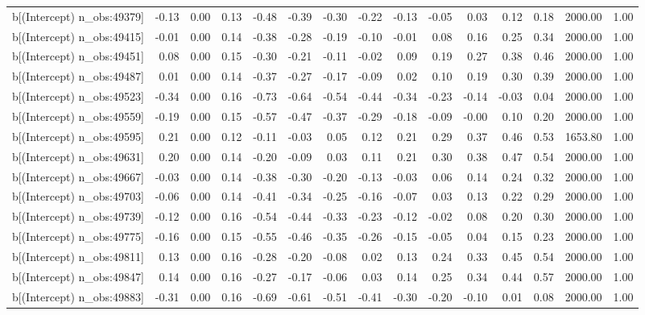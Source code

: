 \begin{table}[ht]
\begin{tabular}{rrrrrrrrrrrrrrr}
  b[(Intercept) n\_obs:49379] & -0.13 & 0.00 & 0.13 & -0.48 & -0.39 & -0.30 & -0.22 & -0.13 & -0.05 & 0.03 & 0.12 & 0.18 & 2000.00 & 1.00 \\ 
  b[(Intercept) n\_obs:49415] & -0.01 & 0.00 & 0.14 & -0.38 & -0.28 & -0.19 & -0.10 & -0.01 & 0.08 & 0.16 & 0.25 & 0.34 & 2000.00 & 1.00 \\ 
  b[(Intercept) n\_obs:49451] & 0.08 & 0.00 & 0.15 & -0.30 & -0.21 & -0.11 & -0.02 & 0.09 & 0.19 & 0.27 & 0.38 & 0.46 & 2000.00 & 1.00 \\ 
  b[(Intercept) n\_obs:49487] & 0.01 & 0.00 & 0.14 & -0.37 & -0.27 & -0.17 & -0.09 & 0.02 & 0.10 & 0.19 & 0.30 & 0.39 & 2000.00 & 1.00 \\ 
  b[(Intercept) n\_obs:49523] & -0.34 & 0.00 & 0.16 & -0.73 & -0.64 & -0.54 & -0.44 & -0.34 & -0.23 & -0.14 & -0.03 & 0.04 & 2000.00 & 1.00 \\ 
  b[(Intercept) n\_obs:49559] & -0.19 & 0.00 & 0.15 & -0.57 & -0.47 & -0.37 & -0.29 & -0.18 & -0.09 & -0.00 & 0.10 & 0.20 & 2000.00 & 1.00 \\ 
  b[(Intercept) n\_obs:49595] & 0.21 & 0.00 & 0.12 & -0.11 & -0.03 & 0.05 & 0.12 & 0.21 & 0.29 & 0.37 & 0.46 & 0.53 & 1653.80 & 1.00 \\ 
  b[(Intercept) n\_obs:49631] & 0.20 & 0.00 & 0.14 & -0.20 & -0.09 & 0.03 & 0.11 & 0.21 & 0.30 & 0.38 & 0.47 & 0.54 & 2000.00 & 1.00 \\ 
  b[(Intercept) n\_obs:49667] & -0.03 & 0.00 & 0.14 & -0.38 & -0.30 & -0.20 & -0.13 & -0.03 & 0.06 & 0.14 & 0.24 & 0.32 & 2000.00 & 1.00 \\ 
  b[(Intercept) n\_obs:49703] & -0.06 & 0.00 & 0.14 & -0.41 & -0.34 & -0.25 & -0.16 & -0.07 & 0.03 & 0.13 & 0.22 & 0.29 & 2000.00 & 1.00 \\ 
  b[(Intercept) n\_obs:49739] & -0.12 & 0.00 & 0.16 & -0.54 & -0.44 & -0.33 & -0.23 & -0.12 & -0.02 & 0.08 & 0.20 & 0.30 & 2000.00 & 1.00 \\ 
  b[(Intercept) n\_obs:49775] & -0.16 & 0.00 & 0.15 & -0.55 & -0.46 & -0.35 & -0.26 & -0.15 & -0.05 & 0.04 & 0.15 & 0.23 & 2000.00 & 1.00 \\ 
  b[(Intercept) n\_obs:49811] & 0.13 & 0.00 & 0.16 & -0.28 & -0.20 & -0.08 & 0.02 & 0.13 & 0.24 & 0.33 & 0.45 & 0.54 & 2000.00 & 1.00 \\ 
  b[(Intercept) n\_obs:49847] & 0.14 & 0.00 & 0.16 & -0.27 & -0.17 & -0.06 & 0.03 & 0.14 & 0.25 & 0.34 & 0.44 & 0.57 & 2000.00 & 1.00 \\ 
  b[(Intercept) n\_obs:49883] & -0.31 & 0.00 & 0.16 & -0.69 & -0.61 & -0.51 & -0.41 & -0.30 & -0.20 & -0.10 & 0.01 & 0.08 & 2000.00 & 1.00 \\ 

\end{tabular}
\end{table}

